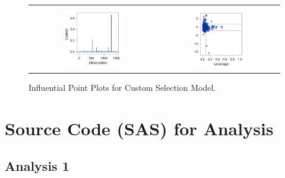 \documentclass[11pt]{scrartcl} %
\begin{document}
\begin{figure}[H] %
	\centering
	\begin{tabular}{p{} p{}}
\hline	
	\multicolumn{1}{|c}{} &  \multicolumn{1}{c|}{} \\
		\multicolumn{1}{|c}{\includegraphics[width=0.48\textwidth]{../graphics/A2Custcooks}} &
		\multicolumn{1}{c|}{\includegraphics[width=0.48\textwidth]{../graphics/A2Custlev}}\\
		\hline
	\end{tabular}		
	\caption{Influential Point Plots for Custom Selection Model.} %
	\label{fig:A2CustomIP}
\end{figure}
\pagebreak

\section{Source Code (SAS) for Analysis}
\label{sec:SourceCode}

\subsection{Analysis 1}
\label{sec:Analysis1}

\end{document}
